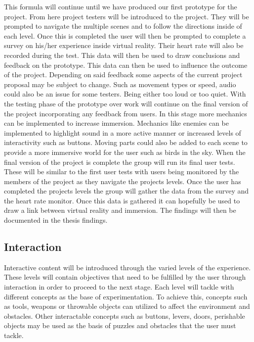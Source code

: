 This formula will continue until we have produced our first prototype for the project. From here project testers will be introduced to the project. They will be prompted to navigate the multiple scenes and to follow the directions inside of each level. Once this is completed the user will then be prompted to complete a survey on his/her experience inside virtual reality. Their heart rate will also be recorded during the test. This data will then be used to draw conclusions and feedback on the prototype. This data can then be used to influence the outcome of the project. Depending on said feedback some aspects of the current project proposal may be subject to change. Such as movement types or speed, audio could also be an issue for some testers. Being either too loud or too quiet. With the testing phase of the prototype over work will continue on the final version of the project incorporating any feedback from users. In this stage more mechanics can be implemented to increase immersion. Mechanics like enemies can be implemented to highlight sound in a more active manner or increased levels of interactivity such as buttons. Moving parts could also be added to each scene to provide a more immersive world for the user such as birds in the sky.  When the final version of the project is complete the group will run its final user tests. These will be similar to the first user tests with users being monitored by the members of the project as they navigate the projects levels. Once the user has completed the projects levels the group will gather the data from the survey and the heart rate monitor. Once this data is gathered it can hopefully be used to draw a link between virtual reality and immersion. The findings will then be documented in the thesis findings. 

\subsection{Interaction}
Interactive content will be introduced through the varied levels of the experience. These levels will contain objectives that need to be fulfilled by the user through interaction in order to proceed to the next stage. Each level will tackle with different concepts as the base of experimentation. To achieve this, concepts such as tools, weapons or throwable objects can utilized to affect the environment and obstacles. Other interactable concepts such as buttons, levers, doors, perishable objects may be used as the basis of puzzles and obstacles that the user must tackle. 

